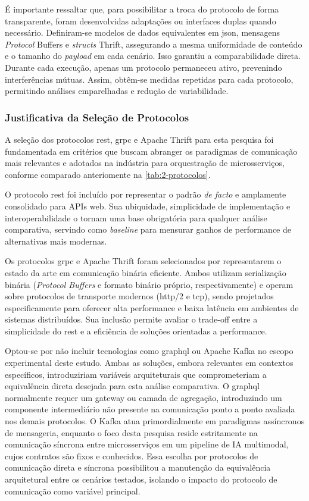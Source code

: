 É importante ressaltar que, para possibilitar a troca do protocolo de forma transparente, foram desenvolvidas adaptações ou interfaces duplas quando necessário. Definiram-se modelos de dados equivalentes em \acrshort{json}, mensagens \textit{Protocol} Buffers e \textit{structs} Thrift, assegurando a mesma uniformidade de conteúdo e o tamanho do \textit{payload} em cada cenário. Isso garantiu a comparabilidade direta. Durante cada execução, apenas um protocolo permaneceu ativo, prevenindo interferências mútuas. Assim, obtêm-se medidas repetidas para cada protocolo, permitindo análises emparelhadas e redução de variabilidade.

\subsubsection{Justificativa da Seleção de Protocolos}
\label{subsec:justificativa-protocolos}

A seleção dos protocolos \acrshort{rest}, \acrshort{grpc} e Apache Thrift para esta pesquisa foi fundamentada em critérios que buscam abranger os paradigmas de comunicação mais relevantes e adotados na indústria para orquestração de microsserviços, conforme comparado anteriomente na \autoref{tab:2-protocolos}.

O protocolo \acrshort{rest} foi incluído por representar o padrão \textit{de facto} e amplamente consolidado para APIs web. Sua ubiquidade, simplicidade de implementação e interoperabilidade o tornam uma base obrigatória para qualquer análise comparativa, servindo como \textit{baseline} para mensurar ganhos de performance de alternativas mais modernas.

Os protocolos \acrshort{grpc} e Apache Thrift foram selecionados por representarem o estado da arte em comunicação binária eficiente. Ambos utilizam serialização binária (\textit{Protocol Buffers} e formato binário próprio, respectivamente) e operam sobre protocolos de transporte modernos (\acrshort{http}/2 e \acrshort{tcp}), sendo projetados especificamente para oferecer alta performance e baixa latência em ambientes de sistemas distribuídos. Sua inclusão permite avaliar o trade-off entre a simplicidade do \acrshort{rest} e a eficiência de soluções orientadas a performance.

Optou-se por não incluir tecnologias como \acrshort{graphql} ou Apache Kafka no escopo experimental deste estudo. Ambas as soluções, embora relevantes em contextos específicos, introduziriam variáveis arquiteturais que comprometeriam a equivalência direta desejada para esta análise comparativa. O \acrshort{graphql} normalmente requer um gateway ou camada de agregação, introduzindo um componente intermediário não presente na comunicação ponto a ponto avaliada nos demais protocolos. O Kafka atua primordialmente em paradigmas assíncronos de mensageria, enquanto o foco desta pesquisa reside estritamente na comunicação síncrona entre microsserviços em um pipeline de IA multimodal, cujos contratos são fixos e conhecidos. Essa escolha por protocolos de comunicação direta e síncrona possibilitou a manutenção da equivalência arquitetural entre os cenários testados, isolando o impacto do protocolo de comunicação como variável principal.

